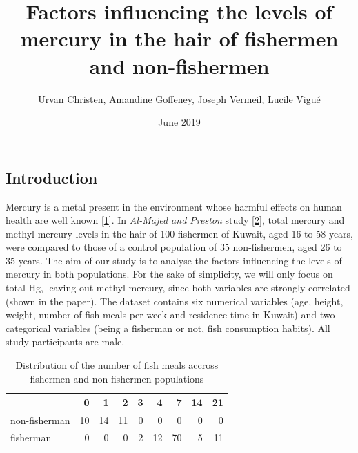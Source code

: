 \documentclass[12pt,]{article}
\title{Factors influencing the levels of mercury in the hair of fishermen and
non-fishermen}
\author{Urvan Christen, Amandine Goffeney, Joseph Vermeil, Lucile Vigué}
\date{June 2019}
\begin{document}
\maketitle

\subsection{Introduction}\label{introduction}

Mercury is a metal present in the environment whose harmful effects on
human health are well known
{[}\protect\hyperlink{ref-park2012human}{1}{]}. In \emph{Al-Majed and
Preston} study {[}\protect\hyperlink{ref-al2000factors}{2}{]}, total
mercury and methyl mercury levels in the hair of 100 fishermen of
Kuwait, aged 16 to 58 years, were compared to those of a control
population of 35 non-fishermen, aged 26 to 35 years. The aim of our
study is to analyse the factors influencing the levels of mercury in
both populations. For the sake of simplicity, we will only focus on
total Hg, leaving out methyl mercury, since both variables are strongly
correlated (shown in the paper). The dataset contains six numerical
variables (age, height, weight, number of fish meals per week and
residence time in Kuwait) and two categorical variables (being a
fisherman or not, fish consumption habits). All study participants are
male.

\begin{table}[t]

\caption{\label{tab:unnamed-chunk-6}\label{tbl:fishmlwk}Distribution of the number of fish meals accross fishermen and non-fishermen populations}
\centering
\begin{tabular}{lrrrrrrrr}
\toprule
  & 0 & 1 & 2 & 3 & 4 & 7 & 14 & 21\\
\midrule
\rowcolor{gray!6}  non-fisherman & 10 & 14 & 11 & 0 & 0 & 0 & 0 & 0\\
fisherman & 0 & 0 & 0 & 2 & 12 & 70 & 5 & 11\\
\bottomrule
\end{tabular}
\end{table}
\end{document}
